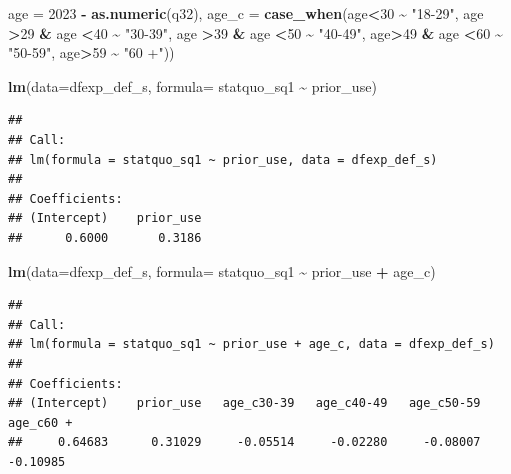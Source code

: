 \documentclass[
  11pt,
]{article}
\newenvironment{Shaded}{\begin{snugshade}}{\end{snugshade}}
\newcommand{\AttributeTok}[1]{\textcolor[rgb]{0.13,0.29,0.53}{#1}}
\newcommand{\DecValTok}[1]{\textcolor[rgb]{0.00,0.00,0.81}{#1}}
\newcommand{\FunctionTok}[1]{\textcolor[rgb]{0.13,0.29,0.53}{\textbf{#1}}}
\newcommand{\NormalTok}[1]{#1}
\newcommand{\SpecialCharTok}[1]{\textcolor[rgb]{0.81,0.36,0.00}{\textbf{#1}}}
\newcommand{\StringTok}[1]{\textcolor[rgb]{0.31,0.60,0.02}{#1}}
\begin{document}
\begin{Shaded}
\begin{Highlighting}[]
         \AttributeTok{age =} \DecValTok{2023} \SpecialCharTok{{-}} \FunctionTok{as.numeric}\NormalTok{(q32),}
         \AttributeTok{age\_c =} \FunctionTok{case\_when}\NormalTok{(age}\SpecialCharTok{\textless{}}\DecValTok{30} \SpecialCharTok{\textasciitilde{}} \StringTok{"18{-}29"}\NormalTok{,}
\NormalTok{                           age }\SpecialCharTok{\textgreater{}}\DecValTok{29} \SpecialCharTok{\&}\NormalTok{ age }\SpecialCharTok{\textless{}}\DecValTok{40} \SpecialCharTok{\textasciitilde{}} \StringTok{"30{-}39"}\NormalTok{,}
\NormalTok{                           age }\SpecialCharTok{\textgreater{}}\DecValTok{39} \SpecialCharTok{\&}\NormalTok{ age }\SpecialCharTok{\textless{}}\DecValTok{50} \SpecialCharTok{\textasciitilde{}} \StringTok{"40{-}49"}\NormalTok{,}
\NormalTok{                           age}\SpecialCharTok{\textgreater{}}\DecValTok{49} \SpecialCharTok{\&}\NormalTok{ age }\SpecialCharTok{\textless{}}\DecValTok{60} \SpecialCharTok{\textasciitilde{}} \StringTok{"50{-}59"}\NormalTok{,}
\NormalTok{                           age}\SpecialCharTok{\textgreater{}}\DecValTok{59} \SpecialCharTok{\textasciitilde{}} \StringTok{"60 +"}\NormalTok{))}


\FunctionTok{lm}\NormalTok{(}\AttributeTok{data=}\NormalTok{dfexp\_def\_s, }\AttributeTok{formula=}\NormalTok{ statquo\_sq1 }\SpecialCharTok{\textasciitilde{}}\NormalTok{  prior\_use)}
\end{Highlighting}
\end{Shaded}

\begin{verbatim}
## 
## Call:
## lm(formula = statquo_sq1 ~ prior_use, data = dfexp_def_s)
## 
## Coefficients:
## (Intercept)    prior_use  
##      0.6000       0.3186
\end{verbatim}

\begin{Shaded}
\begin{Highlighting}[]
\FunctionTok{lm}\NormalTok{(}\AttributeTok{data=}\NormalTok{dfexp\_def\_s, }\AttributeTok{formula=}\NormalTok{ statquo\_sq1 }\SpecialCharTok{\textasciitilde{}}\NormalTok{ prior\_use }\SpecialCharTok{+}\NormalTok{ age\_c)}
\end{Highlighting}
\end{Shaded}

\begin{verbatim}
## 
## Call:
## lm(formula = statquo_sq1 ~ prior_use + age_c, data = dfexp_def_s)
## 
## Coefficients:
## (Intercept)    prior_use   age_c30-39   age_c40-49   age_c50-59    age_c60 +  
##     0.64683      0.31029     -0.05514     -0.02280     -0.08007     -0.10985
\end{verbatim}
\end{document}
